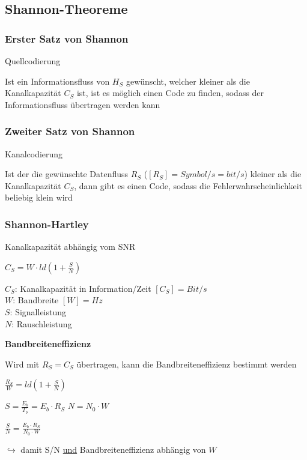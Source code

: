 \subsection{Shannon-Theoreme}

\subsubsection{Erster Satz von Shannon}

Quellcodierung

Ist ein Informationsfluss von $H_S$ gewünscht, welcher kleiner als die Kanalkapazität $C_S$ ist,
ist es möglich einen Code zu finden, sodass der Informationsfluss übertragen werden kann

\subsubsection{Zweiter Satz von Shannon}

Kanalcodierung

Ist der die gewünschte Datenfluss $R_S$ ($[R_S] = Symbol/s = bit/s$) kleiner als die Kanalkapazität $C_S$, dann
gibt es einen Code, sodass die Fehlerwahrscheinlichkeit beliebig klein wird

\subsubsection{Shannon-Hartley}

Kanalkapazität abhängig vom SNR

$\displaystyle{
    C_S = W \cdot ld\left( 1 + \frac{S}{N} \right)
}$

$C_S$: Kanalkapazität in Information/Zeit $[C_S] = Bit/s$\\
$W$: Bandbreite $[W] = Hz$\\
$S$: Signalleistung\\
$N$: Rauschleistung

\textbf{Bandbreiteneffizienz}

Wird mit $R_S = C_S$ übertragen, kann die Bandbreiteneffizienz bestimmt werden

$\displaystyle{
    \frac{R_S}{W} = ld\left( 1 + \frac{S}{N} \right)
}$

$\displaystyle{
    S = \frac{E_b}{T_b} = E_b \cdot R_S
}$\;\;\;\;\;\;\;\;\;\;
$\displaystyle{
    N = N_0 \cdot W
}$

$\displaystyle{
    \frac{S}{N} = \frac{E_b \cdot R_S}{N_0 \cdot W}
}$

$\hookrightarrow$ damit S/N \underline{und} Bandbreiteneffizienz abhängig von $W$


